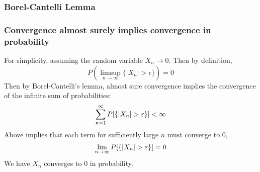 \subsubsection{Borel-Cantelli Lemma}

\subsubsection{Convergence almost surely implies convergence in probability}
\label{proof: a.s.convergence implies convergence in prob}
\begin{prf*}
	For simplicity, assuming the random variable $X_n\rightarrow 0$. Then by definition, 
	$$P\left( \limsup_{n \to \infty} \{|X_n| > \epsilon\} \right) = 0$$
	Then by Borel-Cantelli's lemma, almost sure convergence implies the convergence of the infinite sum of probabilities: 
	$$\sum_{n=1}^\infty P\qty[\{|X_n| > \varepsilon\}] < \infty$$
	Above implies that each term for sufficiently large $n$ must converge to 0,	
	$$\lim_{n\to\infty} P\qty[\{|X_n| > \varepsilon\}] = 0$$
	We have $X_n$ converges to 0 in probability. 
\end{prf*}

